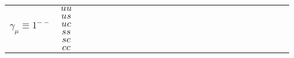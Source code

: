 \documentclass[10pt]{article}
\newcommand{\loq}{{\color[HTML]{006600}{ll}}}
\newcommand{\lon}{{\color[HTML]{800080}{ll}}}
\newcommand{\smq}{{\color[HTML]{006600}{ss}}}
\newcommand{\smn}{{\color[HTML]{800080}{ss}}}
\newcommand{\rcell}{\cellcolor[HTML]{F7CB4A}}
\newcommand{\ocell}{\cellcolor[HTML]{FBAFB5}}
\newcommand{\gcell}{\cellcolor[HTML]{92D2D6}}
\begin{document}
\begin{table}[H]
\begin{adjustbox}{max width=\textwidth}
\begin{tabular}{@{}cc|cc|cc|cc|cc|cc|cc|cc|cc|cc|cc|cc@{}}
        \multirow{6}{*}{$\gamma_\mu \equiv 1^{--}$} 
        & $uu$ 
        & \ocell\loq&\gcell\smq %
        & \gcell\loq&\gcell\smq %
        & \gcell\loq&\gcell\smq %
        & \gcell\loq&\gcell\smq %
        & \gcell\lon&\gcell\smn %
        & \ocell\lon&\gcell\smn %
        & \ocell\lon&\gcell\smn %
        & \ocell\lon&\gcell\smn %
        & \rcell\lon&\gcell\smn %
        & \rcell\lon&\gcell\smn %
        & \rcell\lon&\ocell\smn %
        \\ 
        & $us$ 
        & \gcell\loq&\gcell\smq %
        & \gcell\loq&\gcell\smq %
        & \gcell\loq&\gcell\smn %
        & \gcell\lon&\gcell\smn %
        & \gcell\lon&\gcell\smn %
        & \ocell\lon&\gcell\smn %
        & \ocell\lon&\gcell\smn %
        & \ocell\lon&\gcell\smn %
        & \rcell\lon&\gcell\smn %
        & \rcell\lon&\gcell\smn %
        & \rcell\lon&\ocell\smn %
        \\ 
        & $uc$ 
        & \gcell\loq&\gcell\smq %
        & \gcell\loq&\gcell\smn %
        & \gcell\loq&\gcell\smn %
        & \gcell\lon&\gcell\smn %
        & \ocell\lon&\gcell\smn %
        & \ocell\lon&\gcell\smn %
        & \ocell\lon&\gcell\smn %
        & \ocell\lon&\gcell\smn %
        & \rcell\lon&\gcell\smn %
        & \rcell\lon&\gcell\smn %
        & \rcell\lon&\gcell\smn %
        \\ 
        & $ss$ 
        & \gcell\loq&\gcell\smq %
        & \gcell\loq&\gcell\smq %
        & \gcell\loq&\gcell\smn %
        & \gcell\lon&\gcell\smn %
        & \gcell\lon&\gcell\smn %
        & \ocell\lon&\gcell\smn %
        & \ocell\lon&\gcell\smn %
        & \ocell\lon&\gcell\smn %
        & \rcell\lon&\gcell\smn %
        & \rcell\lon&\gcell\smn %
        & \rcell\lon&\gcell\smn %
        \\ 
        & $sc$ 
        & \gcell\loq&\gcell\smq %
        & \gcell\loq&\gcell\smn %
        & \gcell\loq&\gcell\smn %
        & \gcell\lon&\gcell\smn %
        & \gcell\lon&\gcell\smn %
        & \ocell\lon&\gcell\smn %
        & \ocell\lon&\gcell\smn %
        & \ocell\lon&\gcell\smn %
        & \rcell\lon&\gcell\smn %
        & \rcell\lon&\gcell\smn %
        & \rcell\lon&\ocell\smn %
        \\ 
        & $cc$ 
        & \gcell\loq&\gcell\smq %
        & \gcell\loq&\gcell\smn %
        & \gcell\loq&\gcell\smn %
        & \gcell\lon&\gcell\smn %
        & \gcell\lon&\gcell\smn %
        & \gcell\lon&\gcell\smn %
        & \ocell\lon&\gcell\smn %
        & \ocell\lon&\gcell\smn %
        & \rcell\lon&\gcell\smn %
        & \rcell\lon&\gcell\smn %
        & \rcell\lon&\ocell\smn %
        \\ 
        \midrule


\end{tabular}
\end{adjustbox}
\end{table}
\end{document}
